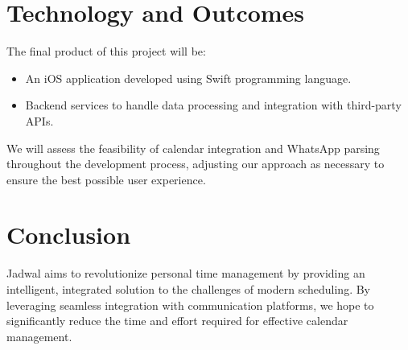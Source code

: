 \documentclass[12pt,a4paper]{article}
\begin{document}
\section{Technology and Outcomes}

The final product of this project will be:

\begin{itemize}
    \item An iOS application developed using Swift programming language.
    \item Backend services to handle data processing and integration with third-party APIs.
\end{itemize}

We will assess the feasibility of calendar integration and WhatsApp parsing throughout the development process, adjusting our approach as necessary to ensure the best possible user experience.

\newpage

\section{Conclusion}

Jadwal aims to revolutionize personal time management by providing an intelligent, integrated solution to the challenges of modern scheduling. By leveraging seamless integration with communication platforms, we hope to significantly reduce the time and effort required for effective calendar management.

\newpage



\end{document}
